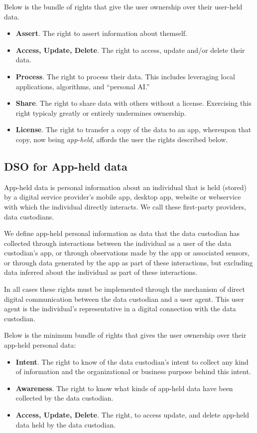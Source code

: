 \documentclass[11pt, oneside]{article}   	%
\begin{document}
Below is the bundle of rights that give the user ownership over their user-held data. 
\begin{itemize}
	\item \textbf{Assert}. The right to assert information about themself.
	\item \textbf{Access, Update, Delete}. The right to access, update and/or delete their data. 
	\item \textbf{Process}. The right to process their data. This includes leveraging local applications, algorithms, and ``personal AI.'' 
	\item \textbf{Share}. The right to share data with others without a license. Exercising this right typicaly greatly or entirely undermines ownership.
	\item \textbf{License}. The right to transfer a copy of the data to an app, whereupon that copy, now being \emph{app-held}, affords the user the rights described below.
\end{itemize}

\subsection{DSO for App-held data}
App-held data is personal information about an individual that is held (stored) by a digital service provider's mobile app, desktop app, website or webservice with which the individual directly interacts. We call these first-party providers, data custodians.

We define app-held personal information as data that the data custodian has collected through interactions between the individual as a user of the data custodian's app, or through observations made by the app or associated sensors, or through data generated by the app as part of these interactions, but excluding data inferred about the individual as part of these interactions.

In all cases these rights must be implemented through the mechanism of direct digital communication between the data custodian and a user agent. This user agent is the individual's representative in a digital connection with the data custodian.

Below is the minimum bundle of rights that gives the user ownership over their app-held personal data:
\begin{itemize}
	\item \textbf{Intent}. The right to know of the data custodian's intent to collect any kind of information and the organizational or business purpose behind this intent.
	\item \textbf{Awareness}. The right to know what kinds of app-held data have been collected by the data custodian.
	\item \textbf{Access, Update, Delete}. The right, to access update, and delete app-held data held by the data custodian. 
\end{itemize}
\end{document}
